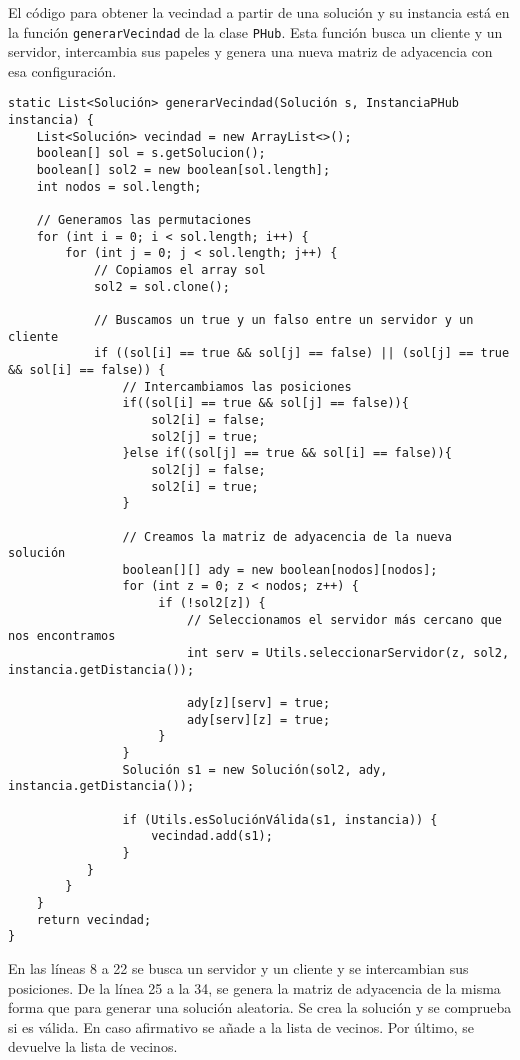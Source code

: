 \documentclass[12pt,a4paper,twoside,openright,titlepage,final]{article}
\begin{document}
El código para obtener la vecindad a partir de una solución y su instancia está en la función \texttt{generarVecindad} de la clase \texttt{PHub}. Esta función busca un cliente y un servidor, intercambia sus papeles y genera una nueva matriz de adyacencia con esa configuración.

\begin{verbatim}
static List<Solución> generarVecindad(Solución s, InstanciaPHub instancia) {
    List<Solución> vecindad = new ArrayList<>();
    boolean[] sol = s.getSolucion();
    boolean[] sol2 = new boolean[sol.length];
    int nodos = sol.length;
	
	// Generamos las permutaciones
    for (int i = 0; i < sol.length; i++) {
        for (int j = 0; j < sol.length; j++) {
            // Copiamos el array sol
            sol2 = sol.clone();

            // Buscamos un true y un falso entre un servidor y un cliente
            if ((sol[i] == true && sol[j] == false) || (sol[j] == true && sol[i] == false)) {	
                // Intercambiamos las posiciones
                if((sol[i] == true && sol[j] == false)){
                    sol2[i] = false;
                    sol2[j] = true;
                }else if((sol[j] == true && sol[i] == false)){
                    sol2[j] = false;
                    sol2[i] = true;
                }
						
                // Creamos la matriz de adyacencia de la nueva solución
                boolean[][] ady = new boolean[nodos][nodos];
                for (int z = 0; z < nodos; z++) {
                     if (!sol2[z]) {
                         // Seleccionamos el servidor más cercano que nos encontramos
                         int serv = Utils.seleccionarServidor(z, sol2, instancia.getDistancia());
                     
                         ady[z][serv] = true;
                         ady[serv][z] = true;
                     }	
                }			
                Solución s1 = new Solución(sol2, ady, instancia.getDistancia());

                if (Utils.esSoluciónVálida(s1, instancia)) {
                    vecindad.add(s1);
                }
           }
        }
    }
    return vecindad;
}

\end{verbatim}

En las líneas 8 a 22 se busca un servidor y un cliente y se intercambian sus posiciones. De la línea 25 a la 34, se genera la matriz de adyacencia de la misma forma que para generar una solución aleatoria. Se crea la solución y se comprueba si es válida. En caso afirmativo se añade a la lista de vecinos. Por último, se devuelve la lista de vecinos.
\end{document}

